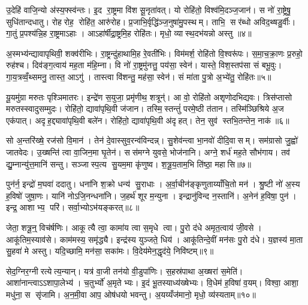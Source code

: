 उ॒देहि॑ वाजि॒न्यो अ॑स्य॒फ्स्व॑न्तः। इ॒द रा॒ष्ट्रमा वि॑श सू॒नृता॑वत्। यो रोहि॑तो॒ विश्व॑मि॒दञ्ज॒जान॑। स नो॑ रा॒ष्ट्रेषु॒ सुधि॑तान्दधातु। रोहरोह॒ रोहि॑त॒ आरु॑रोह। प्र॒जाभि॒र्वृद्धि॑ञ्ज॒नुषा॑मु॒पस्थम्। ताभि॒ सर॑ब्धो अविद॒थ्षडु॒र्वीः। गा॒तुं प्र॒पश्य॑न्नि॒ह रा॒ष्ट्रमाऽहाः। आऽहा॑र्\mbox{}षीद्रा॒ष्ट्रमि॒ह रोहि॑तः। मृधो॒ व्यास्थ॒दभ॑यन्नो अस्तु ॥४॥

अ॒स्मभ्य॑न्द्यावापृथिवी॒ शक्व॑रीभिः। रा॒ष्ट्रन्दु॑हाथामि॒ह रे॒वती॑भिः। विम॑मर्\mbox{}श॒ रोहि॑तो वि॒श्वरू॑पः। स॒मा॒च॒क्रा॒णः प्र॒रुहो॒ रुह॑श्च। दिव॑ङ्ग॒त्वाय॑ मह॒ता म॑हि॒म्ना। वि नो॑ रा॒ष्ट्रमु॑नत्तु॒ पय॑सा॒ स्वेन॑। यास्ते॒ विश॒स्तप॑सा सं बभू॒वुः। गा॒य॒त्रव्वँ॒थ्समनु॒ तास्त॒ आऽगु॑। तास्त्वा वि॑शन्तु॒ मह॑सा॒ स्वेन॑। सं मा॑ता पु॒त्रो अ॒भ्ये॑तु॒ रोहि॑तः॥५॥

यू॒यमु॑ग्रा मरुतः पृश्ञिमातरः। इन्द्रे॑ण स॒युजा॒ प्रमृ॑णीथ॒ शत्रून्॑। आ वो॒ रोहि॑तो अशृणोदभिद्यवः। त्रिस॑प्तासो मरुतस्स्वादुसम्मुदः। रोहि॑तो॒ द्यावा॑पृथि॒वी ज॑जान। तस्मि॒स्तन्तुं॑ परमे॒ष्ठी त॑तान। तस्मि॑ञ्छिश्रिये अ॒ज एक॑पात्। अदृह॒द्द्यावा॑पृथि॒वी बले॑न। रोहि॑तो॒ द्यावा॑पृथि॒वी अ॑दृहत्। तेन॒ सुव॑ स्तभि॒तन्तेन॒ नाक॑॥६॥

सो अ॒न्तरि॑ख्षे॒ रज॑सो वि॒मान॑। तेन॑ दे॒वास्सुव॒रन्व॑विन्दन्न्। सु॒शेव॑न्त्वा भा॒नवो॑ दीदि॒वासम्। सम॑ग्रासो जु॒ह्वो॑ जातवेदः। उ॒ख्षन्ति॑ त्वा वा॒जिन॒मा घृ॒तेन॑। सस॑मग्ने युवसे॒ भोज॑नानि। अग्ने॒ शर्ध॑ मह॒ते सौभ॑गाय। तव॑ द्यु॒म्नान्यु॑त्त॒मानि॑ सन्तु। सञ्जास्प॒त्य सु॒यम॒मा कृ॑णुष्व। श॒त्रू॒य॒ताम॒भि ति॑ष्ठा॒ महासि॥७॥\anuvakamend[अ॒स्त्वे॒तु॒ रोहि॑तो॒ नाको॒ महासि]

पुन॑र्न॒ इन्द्रो॑ म॒घवा॑ ददातु। धना॑नि श॒क्रो धन्य॑ सु॒राधाः। अ॒र्वा॒चीन॑ङ्कृणुताय्याँचि॒तो मन॑। श्रु॒ष्टी नो॑ अ॒स्य ह॒विषो॑ जुषा॒णः। यानि॑ नोऽजि॒नन्धना॑नि। ज॒हर्थ॑ शूर म॒न्युना। इन्द्रानु॑विन्द न॒स्तानि॑। अ॒नेन॑ ह॒विषा॒ पुन॑। इन्द्र॒ आशाभ्य॒ परि॑। सर्वा॒भ्योऽभ॑यङ्करत्॥८॥

जेता॒ शत्रू॒न्॒ विच॑र्\mbox{}षणिः। आकूत्यै त्वा॒ कामा॑य त्वा स॒मृधे त्वा। पु॒रो द॑धे अमृत॒त्वाय॑ जी॒वसे। आकू॑तिम॒स्याव॑से। काम॑मस्य॒ समृ॑द्ध्यै। इन्द्र॑स्य युञ्जते॒ धिय॑। आकू॑तिन्दे॒वीं मन॑सः पु॒रो द॑धे। य॒ज्ञस्य॑ मा॒ता सु॒हवा॑ मे अस्तु। यदि॒च्छामि॒ मन॑सा॒ सका॑मः। वि॒देय॑मेन॒द्धृद॑ये॒ निवि॑ष्टम्॥९॥

सेद॒ग्निर॒ग्नीरत्येत्य॒न्यान्। यत्र॑ वा॒जी तन॑यो वी॒डुपा॑णिः। स॒हस्र॑पाथा अ॒ख्षरा॑ स॒मेति॑। आशा॑नान्त्वाऽऽशापा॒लेभ्य॑। च॒तुर्भ्यो॑ अ॒मृतेभ्यः। इ॒दं भू॒तस्याध्य॑ख्षेभ्यः। वि॒धेम॑ ह॒विषा॑ व॒यम्। विश्वा॒ आशा॒ मधु॑ना॒ स सृ॑जामि। अ॒न॒मी॒वा आप॒ ओष॑धयो भवन्तु। अ॒यय्यँज॑मानो॒ मृधो॒ व्य॑स्यताम्॥१०॥

